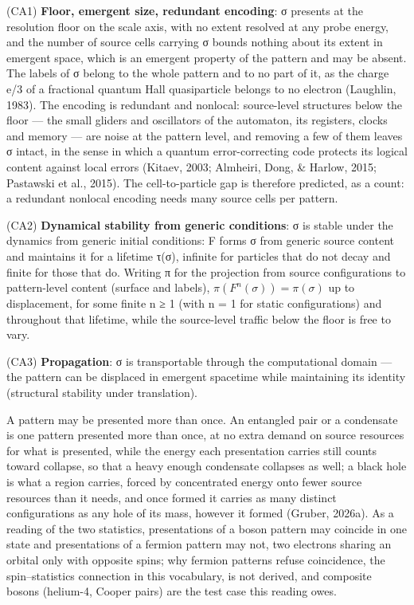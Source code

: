 \documentclass[
]{article}
\begin{document}
(CA1) \textbf{Floor, emergent size, redundant encoding}: σ presents at
the resolution floor on the scale axis, with no extent resolved at any
probe energy, and the number of source cells carrying σ bounds nothing
about its extent in emergent space, which is an emergent property of the
pattern and may be absent. The labels of σ belong to the whole pattern
and to no part of it, as the charge e/3 of a fractional quantum Hall
quasiparticle belongs to no electron (Laughlin, 1983). The encoding is
redundant and nonlocal: source-level structures below the floor --- the
small gliders and oscillators of the automaton, its registers, clocks
and memory --- are noise at the pattern level, and removing a few of
them leaves σ intact, in the sense in which a quantum error-correcting
code protects its logical content against local errors (Kitaev, 2003;
Almheiri, Dong, \& Harlow, 2015; Pastawski et al., 2015). The
cell-to-particle gap is therefore predicted, as a count: a redundant
nonlocal encoding needs many source cells per pattern.

(CA2) \textbf{Dynamical stability from generic conditions}: σ is stable
under the dynamics from generic initial conditions: F forms σ from
generic source content and maintains it for a lifetime τ(σ), infinite
for particles that do not decay and finite for those that do. Writing π
for the projection from source configurations to pattern-level content
(surface and labels), \(\pi(F^n(\sigma)) = \pi(\sigma)\) up to
displacement, for some finite n ≥ 1 (with n = 1 for static
configurations) and throughout that lifetime, while the source-level
traffic below the floor is free to vary.

(CA3) \textbf{Propagation}: σ is transportable through the computational
domain --- the pattern can be displaced in emergent spacetime while
maintaining its identity (structural stability under translation).

A pattern may be presented more than once. An entangled pair or a
condensate is one pattern presented more than once, at no extra demand
on source resources for what is presented, while the energy each
presentation carries still counts toward collapse, so that a heavy
enough condensate collapses as well; a black hole is what a region
carries, forced by concentrated energy onto fewer source resources than
it needs, and once formed it carries as many distinct configurations as
any hole of its mass, however it formed (Gruber, 2026a). As a reading of
the two statistics, presentations of a boson pattern may coincide in one
state and presentations of a fermion pattern may not, two electrons
sharing an orbital only with opposite spins; why fermion patterns refuse
coincidence, the spin--statistics connection in this vocabulary, is not
derived, and composite bosons (helium-4, Cooper pairs) are the test case
this reading owes.
\end{document}
